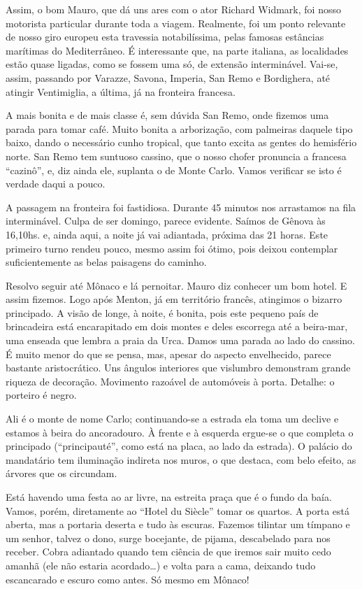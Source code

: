 Assim, o bom Mauro, que dá uns ares com o ator Richard Widmark, foi nosso motorista particular durante toda a viagem. Realmente, foi um ponto relevante de nosso giro europeu esta travessia notabilíssima, pelas famosas estâncias marítimas do Mediterrâneo. É interessante que, na parte italiana, as localidades estão quase ligadas, como se fossem uma só, de extensão interminável. Vai-se, assim, passando por Varazze, Savona, Imperia, San Remo e Bordighera, até atingir Ventimiglia, a última, já na fronteira francesa.

A mais bonita e de mais classe é, sem dúvida San Remo, onde fizemos uma parada para tomar café. Muito bonita a arborização, com palmeiras daquele tipo baixo, dando o necessário cunho tropical, que tanto excita as gentes do hemisfério norte. San Remo tem suntuoso cassino, que o nosso chofer pronuncia a francesa ``cazinô'', e, diz ainda ele, suplanta o de Monte Carlo. Vamos verificar se isto é verdade daqui a pouco.

A passagem na fronteira foi fastidiosa. Durante 45 minutos nos arrastamos na fila interminável. Culpa de ser domingo, parece evidente. Saímos de Gênova às 16,10hs. e, ainda aqui, a noite já vai adiantada, próxima das 21 horas. Este primeiro turno rendeu pouco, mesmo assim foi ótimo, pois deixou contemplar suficientemente as belas paisagens do caminho.

Resolvo seguir até Mônaco e lá pernoitar. Mauro diz conhecer um bom hotel. E assim fizemos. Logo após Menton, já em território francês, atingimos o bizarro principado. A visão de longe, à noite, é bonita, pois este pequeno país de brincadeira está encarapitado em dois montes e deles escorrega até a beira-mar, uma enseada que lembra a praia da Urca. Damos uma parada ao lado do cassino. É muito menor do que se pensa, mas, apesar do aspecto envelhecido, parece bastante aristocrático. Uns ângulos interiores que vislumbro demonstram grande riqueza de decoração. Movimento razoável de automóveis à porta. Detalhe: o porteiro é negro.

Ali é o monte de nome Carlo; continuando-se a estrada ela toma um declive e estamos à beira do ancoradouro. À frente e à esquerda ergue-se o que completa o principado (``principauté'', como está na placa, ao lado da estrada). O palácio do mandatário tem iluminação indireta nos muros, o que destaca, com belo efeito, as árvores que os circundam.

Está havendo uma festa ao ar livre, na estreita praça que é o fundo da baía. Vamos, porém, diretamente ao ``Hotel du Siècle'' tomar os quartos. A porta está aberta, mas a portaria deserta e tudo às escuras. Fazemos tilintar um tímpano e um senhor, talvez o dono, surge bocejante, de pijama, descabelado para nos receber. Cobra adiantado quando tem ciência de que iremos sair muito cedo amanhã (ele não estaria acordado\ldots) e volta para a cama, deixando tudo escancarado e escuro como antes. Só mesmo em Mônaco!

